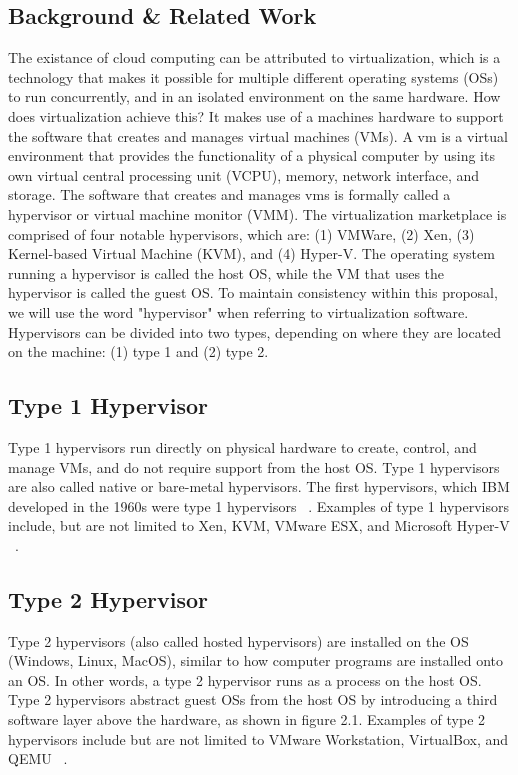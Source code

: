 \documentclass[12pt]{report}
\begin{document}
\begin{doublespace}
\chapter{Background \& Related Work}





The existance of cloud computing can be attributed to virtualization, which is a technology that makes it possible for multiple different operating systems (OSs) to run concurrently, and in an isolated environment on the same hardware. How does virtualization achieve this? It makes use of a machines hardware to support the software that creates and manages virtual machines (VMs). A \gls{vm} is a virtual environment that provides the functionality of a physical computer by using its own virtual central processing unit (VCPU), memory, network interface, and storage. The software that creates and manages \glspl{vm} is formally called a hypervisor or virtual machine monitor (VMM). The virtualization marketplace is comprised of four notable hypervisors, which are: (1) VMWare, (2) Xen, (3) Kernel-based Virtual Machine (KVM), and (4) Hyper-V. The operating system running a hypervisor is called the host OS, while the VM that uses the hypervisor is called the guest OS. To maintain consistency within this proposal, we will use the word "hypervisor" when referring to virtualization software. Hypervisors can be divided into two types, depending on where they are located on the machine: (1) type 1 and (2) type 2.

\section{Type 1 Hypervisor}

Type 1 hypervisors run directly on physical hardware to create, control, and manage VMs, and do not require support from the host OS. Type 1 hypervisors are also called native or bare-metal hypervisors. The first hypervisors, which IBM developed in the 1960s were type 1 hypervisors ~\cite{meier2008ibm}. Examples of type 1 hypervisors include, but are not limited to Xen, KVM, VMware ESX, and Microsoft Hyper-V ~\cite{bauman2015survey}.


\section{Type 2 Hypervisor}

Type 2 hypervisors (also called hosted hypervisors) are installed on the OS (Windows, Linux, MacOS), similar to how computer programs are installed onto an OS. In other words, a type 2 hypervisor runs as a process on the host OS. Type 2 hypervisors abstract guest OSs from the host OS by introducing a third software layer above the hardware, as shown in figure 2.1. Examples of type 2 hypervisors include but are not limited to VMware Workstation, VirtualBox, and QEMU ~\cite{bauman2015survey}.




\end{doublespace}
\end{document}
